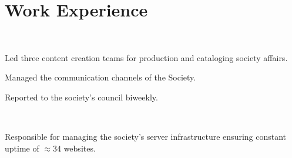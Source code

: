 \documentclass[]{hieudo-build}
\begin{document}
\begin{minipage}[t]{0.65\textwidth}


\section{Work Experience}

 \\
\begin{tightemize}
\item Led three content creation teams for production and cataloging society affairs.
\item Managed the communication channels of the Society.
\item Reported to the society's council biweekly.
\end{tightemize}
\sectionsep

\\
\begin{tightemize}
\item Responsible for managing the society's server infrastructure ensuring constant uptime of $\approx 34$ websites.
\end{tightemize}
\sectionsep



\end{minipage}
\end{document}
